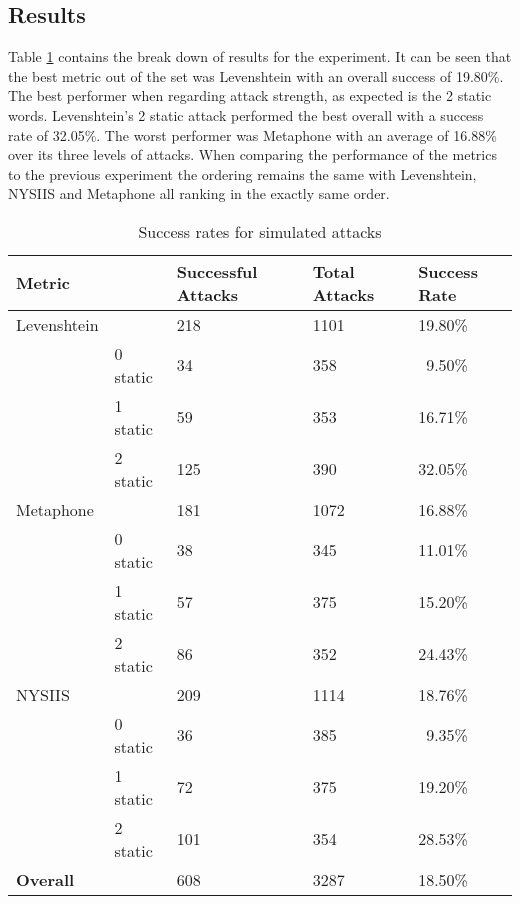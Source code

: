\newpage

\subsection*{Results}
Table \ref{tab:exp2_attacks} contains the break down of results for the experiment. It can be seen that the best metric out of the set was Levenshtein with an overall success of 19.80\%. The best performer when regarding attack strength, as expected is the 2 static words. Levenshtein's 2 static attack performed the best overall with a success rate of 32.05\%. The worst performer was Metaphone with an average of 16.88\% over its three levels of attacks. When comparing the performance of the metrics to the previous experiment the ordering remains the same with Levenshtein, NYSIIS and Metaphone all ranking in the exactly same order.

\begin{table}
    \centering
    \begin{tabular}{|ll|l|l|l|}
        \hline
        \textbf{Metric} & & \textbf{Successful Attacks} & \textbf{Total Attacks} & \textbf{Success Rate} \\
        \hline
        Levenshtein && 218 & 1101 & 19.80\% \\
        \hline
        & 0 static   & 34  & 358  & ~9.50\% \\
        & 1 static   & 59  & 353  & 16.71\% \\
        & 2 static   & 125  & 390  & 32.05\% \\
        \hline\hline
        Metaphone &&  181 & 1072 & 16.88\% \\
        \hline
        & 0 static   & 38 & 345 & 11.01\% \\
        & 1 static   & 57 & 375 & 15.20\% \\
        & 2 static   & 86 & 352 & 24.43\% \\
        \hline\hline
        NYSIIS &&  209 & 1114 & 18.76\% \\
        \hline
        & 0 static   & 36 & 385 & ~9.35\% \\
        & 1 static   & 72 & 375 & 19.20\% \\
        & 2 static   & 101 & 354 & 28.53\% \\
        \hline\hline
        \textbf{Overall} & & 608 & 3287 & 18.50\% \\
        \hline\hline
    \end{tabular}
    \caption{Success rates for simulated attacks}
    \label{tab:exp2_attacks}
\end{table}

